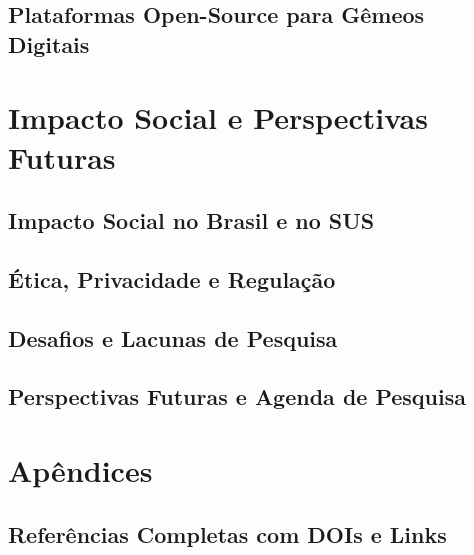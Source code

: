 \newpage
\chapter{Plataformas Open-Source para Gêmeos Digitais} \label{ch:plataformas}


\part{Impacto Social e Perspectivas Futuras}
\newpage
\chapter{Impacto Social no Brasil e no SUS} \label{ch:impacto}


\newpage
\chapter{Ética, Privacidade e Regulação} \label{ch:etica}


\newpage
\chapter{Desafios e Lacunas de Pesquisa} \label{ch:desafios}


\newpage
\chapter{Perspectivas Futuras e Agenda de Pesquisa} \label{ch:futuro}


\part{Apêndices}
\newpage
\chapter{Referências Completas com DOIs e Links} \label{ap:referencias}


